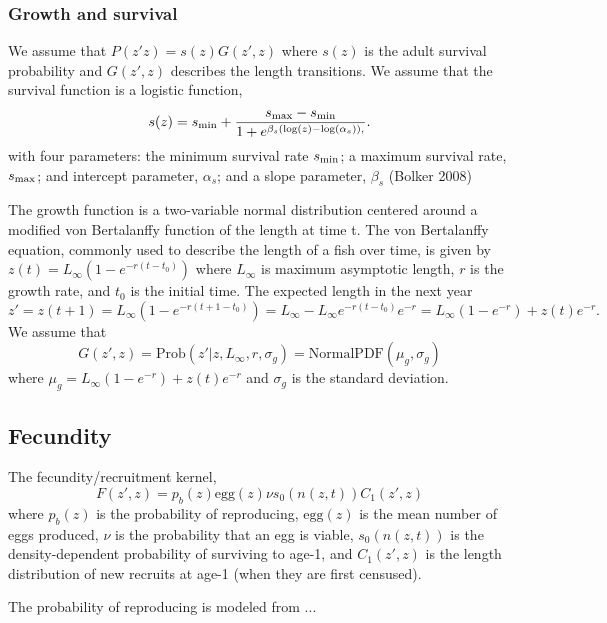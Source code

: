 \documentclass[11pt,oneside]{amsart}
\def\ds{\displaystyle}
\theoremstyle{definition}
\begin{document}
\subsubsection{Growth and survival}
We assume that $P(z'z) = s(z)G(z',z)$ where $s(z)$ is the adult survival probability and $G(z',z)$ describes the length transitions.  We assume that the survival function is a logistic function,
\begin{equation}\label{eq:surv}
s(z) = s_{\rm min} + \frac{s_{\rm max}-s_{\rm min}}{1+e^{\beta_s(\log(z)-\log(\alpha_s)),}}.
\end{equation}
with four parameters: the minimum survival rate $s_{\rm min}$; a maximum survival rate, $s_{\rm max}$; and intercept parameter, $\alpha_s$; and a slope parameter, $\beta_s$ (Bolker 2008)

The growth function is a two-variable normal distribution centered around a modified von Bertalanffy function of the length at time t.  The von Bertalanffy equation, commonly used to describe the length of a fish over time, is given by $\ds z(t) = L_{\infty} \left(1-e^{-r(t-t_0)} \right)$ where $L_\infty$ is maximum asymptotic length, $r$ is the growth rate, and $t_0$ is the initial time. The expected length in the next year
\[ z'=z(t+1) =  L_{\infty} \left(1-e^{-r(t+1-t_0)} \right) =  L_{\infty} - L_{\infty}e^{-r(t-t_0)} e^{-r} =  L_{\infty} \left(1-e^{-r} \right) + z(t)e^{-r}. \]
We assume that 
\begin{equation}\label{eq:grow}
G(z',z) = \mathrm{Prob}(z' | z, L_{\infty}, r, \sigma_g) = \mathrm{Normal PDF}(\mu_g, \sigma_g)
\end{equation}
where $\mu_g =  L_{\infty} \left(1-e^{-r} \right) + z(t)e^{-r}$ and $\sigma_g$ is the standard deviation.

\subsection{Fecundity}
The fecundity/recruitment kernel, 
\begin{equation}\label{eq:fecundity}
F(z',z) = p_b(z) \mbox{egg}(z) \nu s_0(n(z,t))C_1(z', z)
\end{equation}
where $p_b(z)$ is the probability of reproducing, $\mbox{egg}(z)$ is the mean number of eggs produced, $\nu$ is the probability that an egg is viable, $s_0(n(z,t))$ is the density-dependent probability of surviving to age-1, and $C_1 (z',z)$ is the length distribution of new recruits at age-1 (when they are first censused).

The probability of reproducing is modeled from ...
\end{document}
